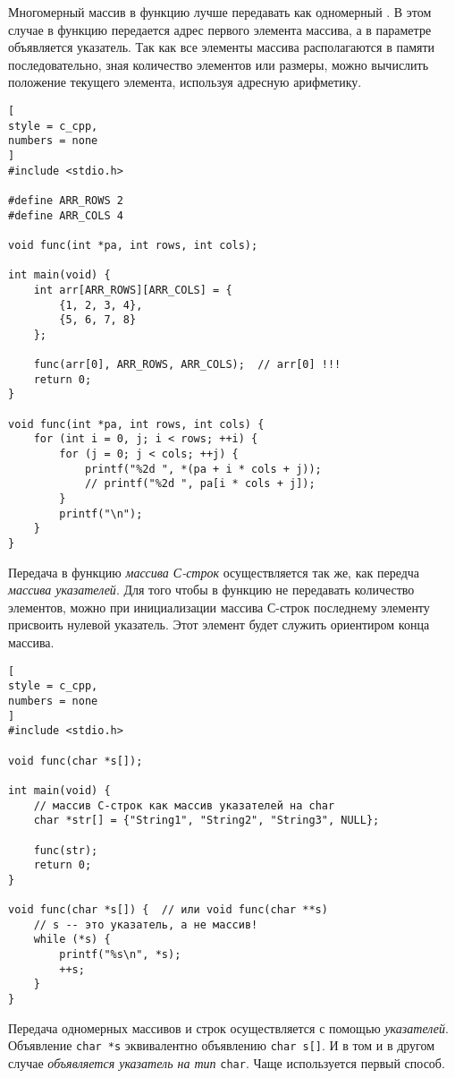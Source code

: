 \documentclass[%
	11pt,
	a4paper,
	utf8,
		]{article}
\begin{document}
Многомерный массив в функцию лучше передавать как одномерный \cite[]{prokhorenok-prog-c:2020}. В этом случае в функцию передается адрес  первого элемента массива, а в параметре объявляется указатель. Так как все элементы массива располагаются в памяти последовательно, зная количество элементов или размеры, можно вычислить положение текущего элемента, используя адресную арифметику.
\begin{lstlisting}[
style = c_cpp,
numbers = none
]
#include <stdio.h>

#define ARR_ROWS 2
#define ARR_COLS 4

void func(int *pa, int rows, int cols);

int main(void) {
    int arr[ARR_ROWS][ARR_COLS] = {
        {1, 2, 3, 4},
        {5, 6, 7, 8}
    };
    
    func(arr[0], ARR_ROWS, ARR_COLS);  // arr[0] !!!
    return 0;
}

void func(int *pa, int rows, int cols) {
    for (int i = 0, j; i < rows; ++i) {
        for (j = 0; j < cols; ++j) {
            printf("%2d ", *(pa + i * cols + j));
            // printf("%2d ", pa[i * cols + j]);
        }
        printf("\n");
    }
}
\end{lstlisting}

Передача в функцию \emph{массива С-строк} осуществляется так же, как передча \emph{массива указателей}. Для того чтобы в функцию не передавать количество элементов, можно при инициализации массива С-строк последнему элементу присвоить нулевой указатель. Этот элемент будет служить ориентиром конца массива.
\begin{lstlisting}[
style = c_cpp,
numbers = none
]
#include <stdio.h>

void func(char *s[]);

int main(void) {
	// массив С-строк как массив указателей на char
    char *str[] = {"String1", "String2", "String3", NULL};
    
    func(str);
    return 0;
}

void func(char *s[]) {  // или void func(char **s) 
	// s -- это указатель, а не массив!
    while (*s) {
        printf("%s\n", *s);
        ++s;
    }
}
\end{lstlisting}

Передача одномерных массивов и строк осуществляется с помощью \emph{указателей}. Объявление \verb|char *s| эквивалентно объявлению \verb|char s[]|. И в том и в другом случае \emph{объявляется указатель на тип} \verb|char|. Чаще используется первый способ.
\end{document}
